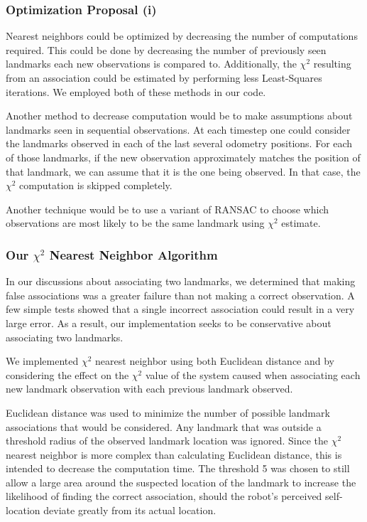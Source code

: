 \documentclass[12pt]{article}
\begin{document}
\subsubsection*{Optimization Proposal (i)}
Nearest neighbors could be optimized by decreasing the number of computations required.  This could be done by decreasing the number of previously seen landmarks each new observations is compared to.  Additionally, the $\chi^2$ resulting from an association could be estimated by performing less Least-Squares iterations. We employed both of these methods in our code.

Another method to decrease computation would be to make assumptions about landmarks seen in sequential observations.  At each timestep one could consider the landmarks observed in each of the last several odometry positions.  For each of those landmarks, if the new observation approximately matches the position of that landmark, we can assume that it is the one being observed. In that case, the $\chi^2$ computation is skipped completely.

Another technique would be to use a variant of RANSAC to choose which observations are most likely to be the same landmark using $\chi^2$ estimate.

\subsubsection*{Our $\chi^2$ Nearest Neighbor Algorithm}
In our discussions about associating two landmarks, we determined that making false associations was a greater failure than not making a correct observation.  A few simple tests showed that a single incorrect association could result in a very large error.  As a result, our implementation seeks to be conservative about associating two landmarks.

We implemented $\chi^2$ nearest neighbor using both Euclidean distance and by considering the effect on the $\chi^2$ value of the system caused when associating each new landmark observation with each previous landmark observed.

Euclidean distance was used to minimize the number of possible landmark associations that would be considered.  Any landmark that was outside a threshold radius of the observed landmark location was ignored.  Since the $\chi^2$ nearest neighbor is more complex than calculating Euclidean distance, this is intended to decrease the computation time.  The threshold 5 was chosen to still allow a large area around the suspected location of the landmark to increase the likelihood of finding the correct association, should the robot's perceived self-location deviate greatly from its actual location.
\end{document}
